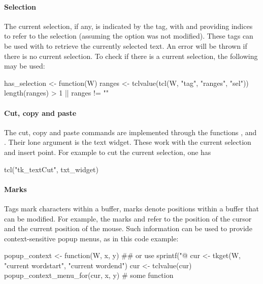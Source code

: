 \paragraph{Selection}
The current selection, if any, is indicated by the  tag,
with  and  providing indices to refer
to the selection (assuming the option  was not
modified). These tags can be used with  to retrieve the
currently selected text. An error will be thrown if there is no
current selection. To check if there is a current selection, the following may be used:
\begin{Schunk}
\begin{Sinput}
 has_selection <- function(W) {
   ranges <- tclvalue(tcl(W, "tag", "ranges", "sel"))
   length(ranges) > 1 || ranges != ""
 }
\end{Sinput}
\end{Schunk}

\paragraph{Cut, copy and paste} 
The cut, copy and paste commands are implemented through the \Tk\/ functions
,  and
. Their lone argument is the text widget. These
work with the current selection and insert point. For example to cut
the current selection, one has
\begin{Schunk}
\begin{Sinput}
 tcl("tk_textCut", txt_widget)
\end{Sinput}
\end{Schunk}

\paragraph{Marks}
Tags mark characters within a buffer, marks denote positions within a
buffer that can be modified. For example, the marks  and
 refer to the position of the cursor and the current
position of the mouse. Such information can be used to provide
context-sensitive popup menus, as in this code example:
\begin{Schunk}
\begin{Sinput}
 popup_context <- function(W, x, y) {
   ## or use sprintf("@%
   cur <- tkget(W, "current wordstart", "current wordend") 
   cur <- tclvalue(cur)
   popup_context_menu_for(cur, x, y)        # some function
 }
\end{Sinput}
\end{Schunk}

